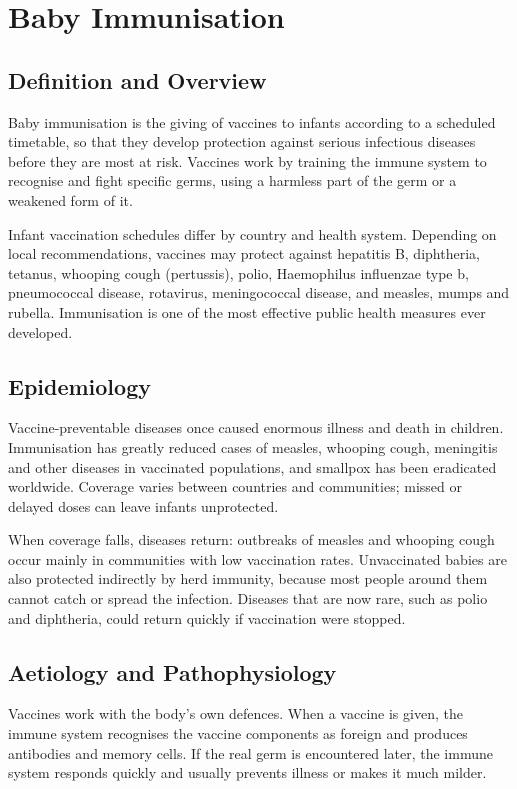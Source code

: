 \chapter{Baby Immunisation}

\section*{Definition and Overview}
Baby immunisation is the giving of vaccines to infants according to a scheduled timetable, so that they develop protection against serious infectious diseases before they are most at risk. Vaccines work by training the immune system to recognise and fight specific germs, using a harmless part of the germ or a weakened form of it.

Infant vaccination schedules differ by country and health system. Depending on local recommendations, vaccines may protect against hepatitis B, diphtheria, tetanus, whooping cough (pertussis), polio, Haemophilus influenzae type b, pneumococcal disease, rotavirus, meningococcal disease, and measles, mumps and rubella. Immunisation is one of the most effective public health measures ever developed.

\section*{Epidemiology}
Vaccine-preventable diseases once caused enormous illness and death in children. Immunisation has greatly reduced cases of measles, whooping cough, meningitis and other diseases in vaccinated populations, and smallpox has been eradicated worldwide. Coverage varies between countries and communities; missed or delayed doses can leave infants unprotected.

When coverage falls, diseases return: outbreaks of measles and whooping cough occur mainly in communities with low vaccination rates. Unvaccinated babies are also protected indirectly by herd immunity, because most people around them cannot catch or spread the infection. Diseases that are now rare, such as polio and diphtheria, could return quickly if vaccination were stopped.

\section*{Aetiology and Pathophysiology}
Vaccines work with the body's own defences. When a vaccine is given, the immune system recognises the vaccine components as foreign and produces antibodies and memory cells. If the real germ is encountered later, the immune system responds quickly and usually prevents illness or makes it much milder.

